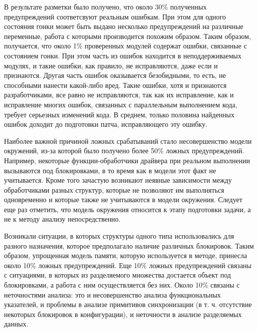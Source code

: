 





В результате разметки было получено, что около 30\% полученных предупреждений соответсвуют реальным ошибкам. 
При этом для одного состояния гонки может быть выдано несколько предупреждений на различные переменные, работа с которыми производится похожим образом.
Таким образом, получается, что около 1\% проверенных модулей содержат ошибки, связанные с состоянием гонки.
При этом часть из ошибок находится в неподдерживаемых модулях, и такие ошибки, как правило, не исправляются, даже если и признаются. 
Другая часть ошибок оказывается безобидными, то есть, не способными нанести какой-либо вред.
Такие ошибки, хотя и признаются разработчиками, все равно не исправляются, так как их исправление, как и исправление многих ошибок, связанных с параллельным выполнением кода, требует серьезных изменений кода.
В среднем, только половина найденных ошибок доходит до подготовки патча, исправляющего эту ошибку.

Наиболее важной причиной ложных срабатываний стало несовершенство модели окружений, из-за которой было  получено  более  50\%  ложных  предупреждений.
Например,  некоторые функции-обработчики  драйвера  при  реальном  выполнении  вызываются  под блокировками, в то время как в модели этот факт не учитывается.
Кроме того зачастую  возникают  неявные  зависимости  между  обработчиками  разных структур,  которые  не  позволяют  им  выполняться одновременно  и  которые также  не  учитываются  в  модели  окружения.
Следует  еще  раз  отметить, что модель окружения относится к этапу подготовки задачи, а не к методу анализу непосредственно. 

Возникали  ситуации,  в  которых  структуры  одного  типа  использовались  для разного  назначения,  которое  предполагало  наличие  различных  блокировок. 
Таким образом, упрощенная модель памяти, которую используется в методе, принесла около 10\% ложных предупреждений. 
Еще 10\%  ложных  предупреждений  связаны  с  ситуациями,  в  которых  из разделяемого множества достается объект под блокировками, а работа с ним 
осуществляется  без них.
Около 10\% связаны с  неточностями анализа: это и несовершенство анализа функциональных указателей, и проблемы в анализе примитивов  синхронизации  (в т. ч. отсутствие некоторых  блокировок  в конфигурации), и неточности в анализе разделяемых данных.  

